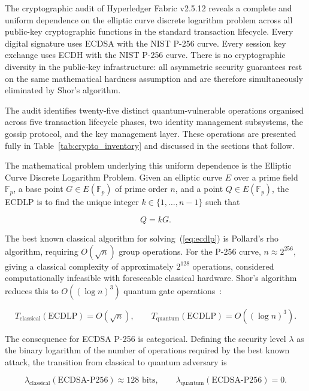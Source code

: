\documentclass[conference]{IEEEtran}
\begin{document}
The cryptographic audit of Hyperledger Fabric v2.5.12 reveals a complete
and uniform dependence on the elliptic curve discrete logarithm problem
across all public-key cryptographic functions in the standard transaction
lifecycle. Every digital signature uses ECDSA with the NIST P-256 curve.
Every session key exchange uses ECDH with the NIST P-256 curve. There is
no cryptographic diversity in the public-key infrastructure: all asymmetric
security guarantees rest on the same mathematical hardness assumption and
are therefore simultaneously eliminated by Shor's algorithm.

The audit identifies twenty-five distinct quantum-vulnerable operations
organised across five transaction lifecycle phases, two identity management
subsystems, the gossip protocol, and the key management layer. These
operations are presented fully in Table~\ref{tab:crypto_inventory} and
discussed in the sections that follow.

The mathematical problem underlying this uniform dependence is the Elliptic
Curve Discrete Logarithm Problem. Given an elliptic curve $E$ over a prime
field $\mathbb{F}_p$, a base point $G \in E(\mathbb{F}_p)$ of prime order
$n$, and a point $Q \in E(\mathbb{F}_p)$, the ECDLP is to find the unique
integer $k \in \{1,\ldots,n-1\}$ such that

\begin{equation}
Q = kG.
\label{eq:ecdlp}
\end{equation}

The best known classical algorithm for solving~(\ref{eq:ecdlp}) is Pollard's
rho algorithm, requiring $O(\sqrt{n})$ group operations. For the P-256 curve,
$n \approx 2^{256}$, giving a classical complexity of approximately $2^{128}$
operations, considered computationally infeasible with foreseeable classical
hardware. Shor's algorithm reduces this to $O((\log n)^3)$ quantum gate
operations~\cite{shor1994}:

\begin{equation}
T_{\mathrm{classical}}(\mathrm{ECDLP}) = O\!\left(\sqrt{n}\right),
\qquad
T_{\mathrm{quantum}}(\mathrm{ECDLP}) = O\!\left((\log n)^3\right).
\label{eq:complexity}
\end{equation}

The consequence for ECDSA P-256 is categorical. Defining the security level
$\lambda$ as the binary logarithm of the number of operations required by the
best known attack, the transition from classical to quantum adversary is

\begin{equation}
\lambda_{\mathrm{classical}}(\mathrm{ECDSA\text{-}P256}) \approx 128\text{ bits},
\qquad
\lambda_{\mathrm{quantum}}(\mathrm{ECDSA\text{-}P256}) = 0.
\label{eq:security_bits}
\end{equation}
\end{document}
